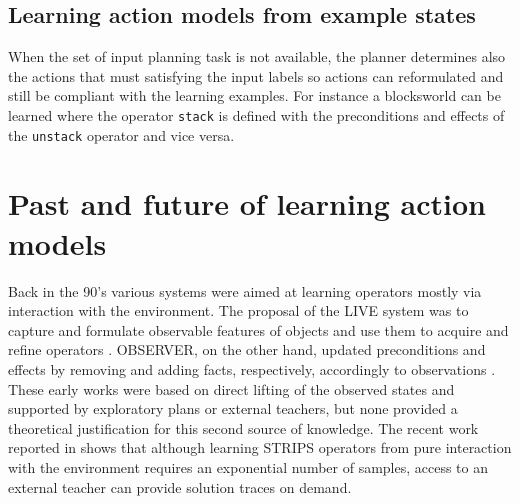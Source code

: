 \documentclass[letterpaper]{article} %
\begin{document}
\subsection{Learning action models from example states}
When the set of input planning task is not available, the planner determines also the actions that must satisfying the input labels so actions can reformulated and still be compliant with the learning examples. For instance a blocksworld can be learned where the operator {\small\tt stack} is defined with the preconditions and effects of the {\small\tt unstack} operator and vice versa.


\section{Past and future of learning action models}

Back in the 90's various systems were aimed at learning operators mostly via interaction with the environment. The proposal of the LIVE system was to capture and formulate observable features of objects and use them to acquire and refine operators \cite{ShenS89}. OBSERVER, on the other hand, updated preconditions and effects by removing and adding facts, respectively, accordingly to observations \cite{Wang95learningby}. These early works were based on direct lifting of the observed states and supported by exploratory plans or external teachers, but none provided a theoretical justification for this second source of knowledge. The recent work reported in \cite{WalshL08} shows that although learning STRIPS operators from pure interaction with the environment requires an exponential number of samples, access to an external teacher can provide solution traces on demand.
\end{document}
